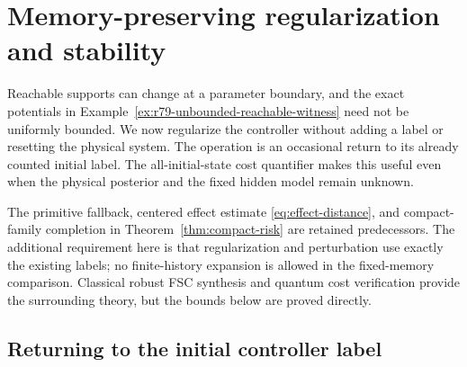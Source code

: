 \section{Memory-preserving regularization and stability}
\label{sec:r79-label-restart}

Reachable supports can change at a parameter boundary, and the exact
potentials in Example~\ref{ex:r79-unbounded-reachable-witness} need
not be uniformly bounded.  We now regularize the controller without
adding a label or resetting the physical system.  The operation is
an occasional return to its already counted initial label.  The
all-initial-state cost quantifier makes this useful even when the
physical posterior and the fixed hidden model remain unknown.

The primitive fallback, centered effect estimate
\eqref{eq:effect-distance}, and compact-family completion in
Theorem~\ref{thm:compact-risk} are retained predecessors.  The
additional requirement here is that regularization and perturbation
use exactly the existing labels; no finite-history expansion is
allowed in the fixed-memory comparison.  Classical robust FSC
synthesis \cite{CubuktepeEtAl21,GaleslootEtAl25} and quantum cost
verification \cite{LiuZhouBartheYing25,AvanziniEtAl22} provide the
surrounding theory, but the bounds below are proved directly.

\subsection{Returning to the initial controller label}

